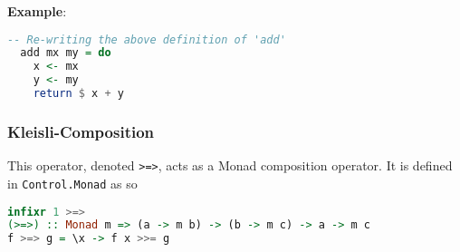\textbf{Example}:
\begin{lstlisting}[language=haskell]
  -- Re-writing the above definition of 'add'
  add mx my = do
    x <- mx
    y <- my
    return $ x + y
\end{lstlisting}

\subsubsection{Kleisli-Composition}
This operator, denoted \texttt{>=>}, acts as a Monad composition operator. It is defined in \texttt{Control.Monad} as so
\begin{lstlisting}[language=haskell]
infixr 1 >=>
(>=>) :: Monad m => (a -> m b) -> (b -> m c) -> a -> m c
f >=> g = \x -> f x >>= g
\end{lstlisting}
